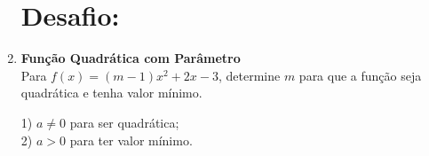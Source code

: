 \documentclass[11pt]{article}
\begin{document}
\begin{multicols}{2}
\begin{enumerate}
\section*{Desafio:}

\item \textbf{Função Quadrática com Parâmetro}\\
Para $f(x) = (m - 1)x^2 + 2x - 3$, determine $m$ para que a função seja quadrática e tenha valor mínimo.
\begin{tcolorbox}[colback=explanationbg,colframe=titleblue,title=Dica:]
1) $a \neq 0$ para ser quadrática; \\ 2) $a > 0$ para ter valor mínimo.
\end{tcolorbox}

\end{enumerate}
\end{multicols}
\end{document}

